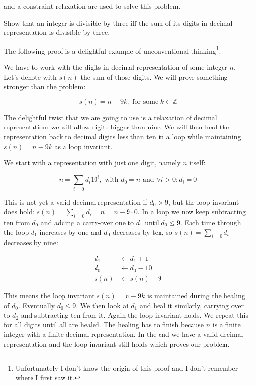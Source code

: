  and a constraint relaxation are used to solve this problem.

\vspace{10 mm}
\begin{problem}
Show that an integer is divisible by three iff the sum of its digits in decimal representation is divisible by three.
\end{problem}

The following proof is a delightful example of unconventional thinking\footnote{Unfortunately I don't know the origin of this proof and I don't remember where I first saw it.}.

We have to work with the digits in decimal representation of some integer $n$. Let's denote with $s(n)$  the sum of those digits. We will prove something stronger than the problem:

$$
s(n) = n - 9 k, \text{ for some } k \in \mathbb{Z}
$$

The delightful twist that we are going to use is a relaxation of decimal representation: we will allow digits bigger than nine. We will then heal the representation back to decimal digits less than ten in a loop while maintaining $s(n) = n - 9 k$ as a loop invariant. 

We start with a representation with just one digit, namely $n$ itself:

$$
n = \sum_{i = 0} d_i 10^i, \text{ with } d_0 = n \text{ and } \forall i > 0: d_i = 0
$$

This is not yet a valid decimal representation if $d_0 > 9$, but the loop invariant does hold: $s(n) = \sum_{i = 0} d_i = n = n - 9 \cdot 0$. In a loop we now keep subtracting ten from $d_0$ and adding a carry-over one to $d_1$ until $d_0 \leq 9$. Each time through the loop $d_1$ increases by one and $d_0$ decreases by ten, so $s(n) = \sum_{i = 0} d_i$ decreases by nine:

\begin{align*}
d_1  & \leftarrow d_1 + 1 \\
d_0  & \leftarrow d_0 - 10 \\
s(n) & \leftarrow s(n) - 9
\end{align*}

This means the loop invariant $s(n) = n - 9 k$ is maintained during the healing of $d_0$. Eventually $d_0 \leq 9$. We then look at $d_1$ and heal it similarly, carrying over to $d_2$ and subtracting ten from it. Again the loop invariant holds. We repeat this for all digits until all are healed. The healing has to finish because $n$ is a finite integer with a finite decimal representation. In the end we have a valid decimal representation and the loop invariant still holds which proves our problem.

